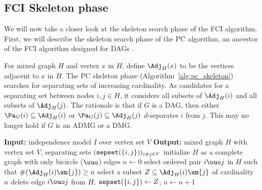 \subsection{FCI Skeleton phase}\label{sec:fci_skeleton}

We will now take a closer look at the skeleton search phase of the FCI algorithm.
First, we will describe the skeleton search phase of the PC algorithm, an ancestor of the FCI algorithm designed for DAGs \cite{SGS2000}.

For mixed graph $H$ and vertex $x$ in $H$, define $\Adj_H(x)$ to be the vertices adjacent to $x$ in $H$.
The PC skeleton phase (Algorithm~\ref{alg:pc_skeleton}) searches for separating sets of increasing cardinality. 
As candidates for a separating set between nodes $i,j \in H$, it considers all subsets of $\Adj_H(i)$ and all subsets of $\Adj_H(j)$.
The rationale is that if $G$ is a DAG, then either $\Pa_G(i) \subseteq \Adj_H(i)$ or $\Pa_G(j) \subseteq \Adj_H(j)$ $d$-separates $i$ from $j$.
This may no longer hold if $G$ is an ADMG or a DMG.

\begin{algorithm}
  \begin{algorithmic}
  \State \textbf{Input:} independence model $I$ over vertex set $V$
  \State \textbf{Output:} mixed graph $H$ with vertex set $V$, separating sets $(\mathtt{sepset}(\{i,j\}))_{i\ne j \in V}$
  \State initialize $H$ as a complete graph with only bicircle ($\ouo$) edges
  \State $n \leftarrow 0$
    \Repeat
    \Repeat
    \State select ordered pair $i \ouo j$ in $H$ such that $\#(\Adj_H(i)\sm\{j\}) \ge n$
    \State select a subset $Z \subseteq \Adj_H(i)\sm\{j\}$ of cardinality $n$
      \State delete edge $i \ouo j$ from $H$;
      \State $\mathtt{sepset}(\{i,j\}) \leftarrow Z$;
    \EndIf
    \State $n \leftarrow n + 1$
  \end{algorithmic}
  \caption{PC skeleton algorithm $\mathtt{PCskeleton}(V,I)$.\label{alg:pc_skeleton}}
\end{algorithm}


